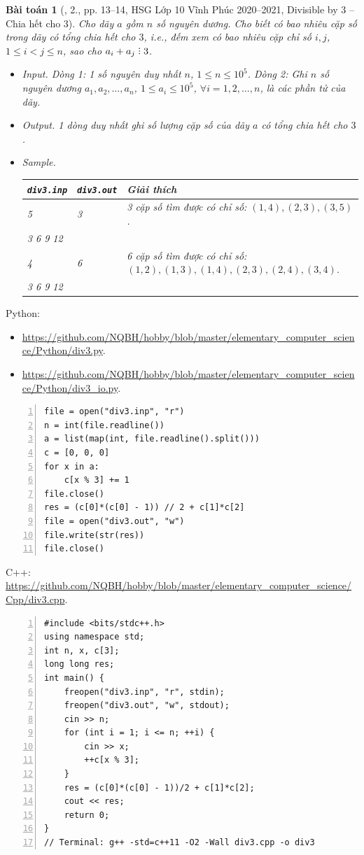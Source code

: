 \documentclass{article}
\newtheorem{baitoan}{Bài toán}
\DeclareRobustCommand{\divby}{%
	\mathrel{\vbox{\baselineskip.65ex\lineskiplimit0pt\hbox{.}\hbox{.}\hbox{.}}}%
}
\begin{document}
\begin{baitoan}[\cite{Trung_HSG_THPT_Tin}, 2., pp. 13--14, HSG Lớp 10 Vĩnh Phúc 2020--2021, Divisible by 3 -- Chia hết cho 3]
	Cho dãy $a$ gồm $n$ số nguyên dương. Cho biết có bao nhiêu cặp số trong dãy có tổng chia hết cho $3$, i.e., đếm xem có bao nhiêu cặp chỉ số $i,j$, $1\le i < j\le n$, sao cho $a_i + a_j\divby3$.
	\begin{itemize}
		\item {\sf Input.} Dòng 1: 1 số nguyên duy nhất $n$, $1\le n\le10^5$. Dòng 2: Ghi $n$ số nguyên dương $a_1,a_2,\ldots,a_n$, $1\le a_i\le10^5$, $\forall i = 1,2,\ldots,n$, là các phần tử của dãy.
		\item {\sf Output.} 1 dòng duy nhất ghi số lượng cặp số của dãy $a$ có tổng chia hết cho $3$.
		\item {\sf Sample.}
		\begin{table}[H]
			\centering
			\begin{tabular}{|l|l|l|}
				\hline
				{\tt div3.inp} & {\tt div3.out} & Giải thích \\
				\hline
				5 & 3 & 3 cặp số tìm được có chỉ số: $(1,4),(2,3),(3,5)$. \\
				3 6 9 12 & & \\
				\hline
				4 & 6 & 6 cặp số tìm được có chỉ số: $(1,2),(1,3),(1,4),(2,3),(2,4),(3,4)$. \\
				3 6 9 12 & & \\
				\hline
			\end{tabular}
		\end{table}
	\end{itemize}
\end{baitoan}
Python:
\begin{itemize}
	\item \url{https://github.com/NQBH/hobby/blob/master/elementary_computer_science/Python/div3.py}.
	\item \url{https://github.com/NQBH/hobby/blob/master/elementary_computer_science/Python/div3_io.py}.
\end{itemize}
\begin{Verbatim}[numbers=left,xleftmargin=5mm]
file = open("div3.inp", "r")
n = int(file.readline())
a = list(map(int, file.readline().split()))
c = [0, 0, 0]
for x in a:
    c[x % 3] += 1
file.close()
res = (c[0]*(c[0] - 1)) // 2 + c[1]*c[2]
file = open("div3.out", "w")
file.write(str(res))
file.close()
\end{Verbatim}
C++: \url{https://github.com/NQBH/hobby/blob/master/elementary_computer_science/Cpp/div3.cpp}.
\begin{Verbatim}[numbers=left,xleftmargin=5mm]
#include <bits/stdc++.h>
using namespace std;
int n, x, c[3];
long long res;
int main() {
    freopen("div3.inp", "r", stdin);
    freopen("div3.out", "w", stdout);
    cin >> n;
    for (int i = 1; i <= n; ++i) {
        cin >> x;
        ++c[x % 3];
    }
    res = (c[0]*(c[0] - 1))/2 + c[1]*c[2];
    cout << res;
    return 0;
}
// Terminal: g++ -std=c++11 -O2 -Wall div3.cpp -o div3
\end{Verbatim}
\end{document}
